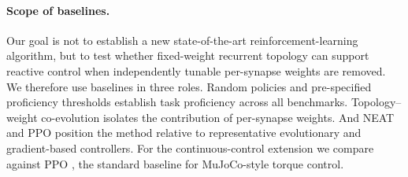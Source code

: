 \documentclass[10pt]{article}
\begin{document}
\paragraph{Scope of baselines.} Our goal is not to establish a new
state-of-the-art reinforcement-learning algorithm, but to test whether
fixed-weight recurrent topology can support reactive control when independently
tunable per-synapse weights are removed. We therefore use baselines in three
roles. Random policies and pre-specified proficiency thresholds establish task
proficiency across all benchmarks. Topology--weight co-evolution isolates the contribution of
per-synapse weights. And NEAT and PPO position the method relative to
representative evolutionary and gradient-based controllers. For the
continuous-control extension we compare against PPO \citep{schulman2017}, the
standard baseline for MuJoCo-style torque control.
\end{document}
